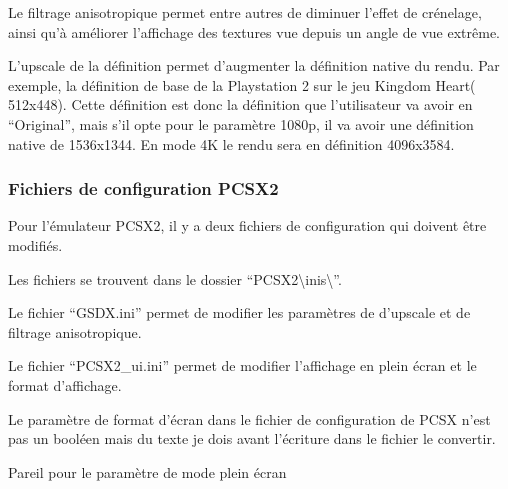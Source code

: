 \documentclass[a4paper,12pt,french]{sphinxmanual}
\begin{document}
\sphinxAtStartPar
Le filtrage anisotropique permet entre autres de diminuer l’effet de crénelage, ainsi qu’à améliorer l’affichage des textures vue depuis un angle de vue extrême.

\sphinxAtStartPar
L’upscale de la définition permet d’augmenter la définition native du rendu. Par exemple, la définition de base de la Playstation 2 sur le jeu Kingdom Heart( 512x448). Cette définition est donc la définition que l’utilisateur va avoir en “Original”, mais s’il opte pour le paramètre 1080p, il va avoir une définition native de 1536x1344. En mode 4K le rendu sera en définition 4096x3584.


\subsubsection{Fichiers de configuration PCSX2}
\label{\detokenize{organique:fichiers-de-configuration-pcsx2}}
\sphinxAtStartPar
Pour l’émulateur PCSX2, il y a deux fichiers de configuration qui doivent être modifiés.

\sphinxAtStartPar
Les fichiers se trouvent dans le dossier “PCSX2\textbackslash{}inis\textbackslash{}”.

\sphinxAtStartPar
Le fichier “GSDX.ini” permet de modifier les paramètres de d’upscale et de filtrage anisotropique.

\sphinxAtStartPar
Le fichier “PCSX2\_ui.ini” permet de modifier l’affichage en plein écran et le format d’affichage.

\sphinxAtStartPar
Le paramètre de format d’écran dans le fichier de configuration de PCSX n’est pas un booléen mais du texte je dois avant l’écriture dans le fichier le convertir.

\sphinxAtStartPar
Pareil pour le paramètre de mode plein écran
\end{document}
